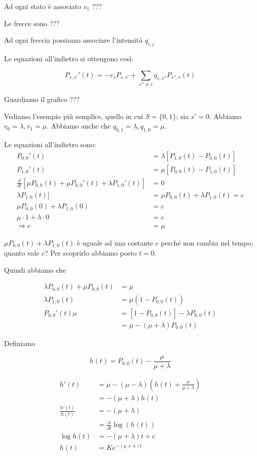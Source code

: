 \documentclass[a4paper,12pt]{book}
\begin{document}
Ad ogni stato è associato $ v_1 $ ??? %

Le frecce sono ??? %

Ad ogni freccia possiamo associare l'intensità $ q_{i,j} $

Le equazioni all'indietro si ottengono così:

$$ P_{s,s'}'(t) = -v_sP_{s,s'} + \sum_{s''\ne s} q_{s,s''} P_{s'',s}(t)$$

Guardiamo il grafico ??? %

Vediamo l'esempio più semplice, quello in cui $ S = \{0,1\} $; sia $ s' = 0 $. Abbiamo $ v_0 = \lambda, v_1 = \mu $. Abbiamo anche che $ q_{0,1} = \lambda, q_{1,0} = \mu $.

Le equazioni all'indietro sono:
\begin{align*}
	P_{0,0}'(t) & = \lambda[P_{1,0}(t) - P_{0,0}(t)] \\
	P_{1,0}'(t) & = \mu [P_{0,0}(t) - P_{1,0}(t) ] \\
	\frac{d}{dt} [\mu P_{0,0}(t) + \mu P_{0,0}'(t) + \lambda P_{1,0}'(t) ] & = 0 \\
	\lambda P_{1,0}(t)] & = \mu P_{0,0}(t) + \lambda P_{1,0}(t) = c \\ %
	\mu P_{0,0}(0) + \lambda P_{1,0}(0) & = c \\
	\mu \cdot 1 + \lambda \cdot 0 & = c \\
	\Rightarrow c & = \mu
\end{align*}

$ \mu P_{0,0}(t) + \lambda P_{1,0}(t) $ è uguale ad una costante $ c $ perché non cambia nel tempo; quanto vale $ c $? Per scoprirlo abbiamo posto $ t = 0 $.

Quindi abbiamo che 

\begin{align*}
	\lambda P_{0,0}(t) + \mu P_{0,0}(t) & = \mu \\
	\lambda P_{1,0}(t) & = \mu(1 - P_{0,0}(t)) \\
	P_{0,0}'(t)\mu & = [1 - P_{0,0}(t)] - \lambda P_{0,0}(t) \\
	& = \mu - (\mu + \lambda) P_{0,0}(t)
\end{align*}

Definiamo 

$$ h(t) = P_{0,0}(t) - \frac{\mu}{\mu + \lambda}$$

\begin{align*}
	h'(t) & = \mu - (\mu - \lambda)(h(t) + \frac{\mu}{\mu + \lambda}) \\
	& = -(\mu + \lambda)h(t) \\
	\frac{h'(t)}{h(t)} & = -(\mu + \lambda) \\
	& = \frac{\partial}{\partial t} \log(h(t)) \\
	\log h(t) & = -(\mu + \lambda)t + c \\
	h(t) & = K e^{-(\mu + \lambda)t}
\end{align*}
\end{document}
